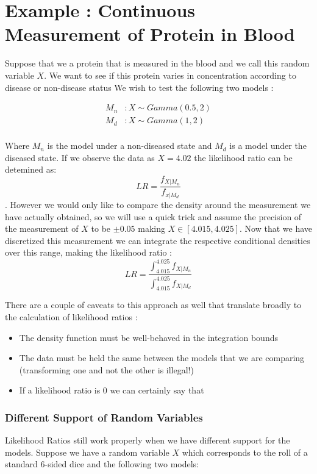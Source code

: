 \documentclass[11pt]{article}
\begin{document}
\section*{Example : Continuous Measurement of Protein in Blood}
Suppose that we a protein that is measured in the blood and we call this random variable $X$. We want to see if this protein varies in concentration according to disease or non-disease status We wish to test the following two models :

\begin{align*}
M_n &: X \sim Gamma(0.5, 2)\\
M_d &: X \sim Gamma(1,2)\\
\end{align*}

Where $M_n$ is the model under a non-diseased state and $M_d$ is a model under the diseased state. If we observe the data as $X = 4.02$ the likelihood ratio can be detemined as: $$ LR = \frac{f_{X|M_n}}{ f_{x | M_d}}$$. However we would only like to compare the density around the measurement we have actually obtained, so we will use a quick trick and assume the precision of the measurement of $X$ to be $\pm 0.05$ making $X \in [4.015, 4.025]$. Now that we have discretized this measurement we can integrate the respective conditional densities over this range, making the likelihood ratio : 
$$ LR = \frac{ \int^{4.025}_{4.015} f_{X | M_n} }{\int^{4.025}_{4.015} f_{X | M_d} }$$

There are a couple of caveats to this approach as well that translate broadly to the calculation of likelihood ratios : 

\begin{itemize}
	\item The density function must be well-behaved in the integration bounds
	\item The data must be held the same between the models that we are comparing (transforming one and not the other is illegal!)
	\item If a likelihood ratio is 0 we can certainly say that 
\end{itemize}

\subsubsection*{Different Support of Random Variables}

Likelihood Ratios still work properly when we have different support for the models. Suppose we have a random variable $X$ which corresponds to the roll of a standard 6-sided dice and the following two models: 
\end{document}
